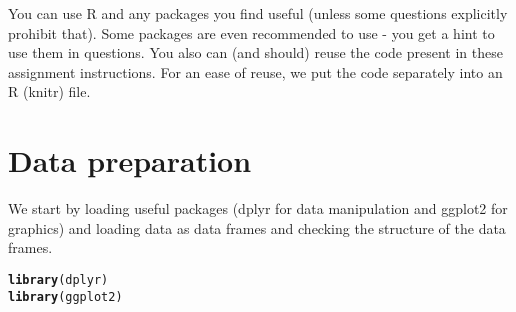 \documentclass{article}\usepackage[]{graphicx}\usepackage[]{color}
\makeatletter
\newcommand{\hlstd}[1]{\textcolor[rgb]{0.345,0.345,0.345}{#1}}%
\newcommand{\hlkwd}[1]{\textcolor[rgb]{0.737,0.353,0.396}{\textbf{#1}}}%
\newenvironment{kframe}{%
 \def\at@end@of@kframe{}%
 \ifinner\ifhmode%
  \def\at@end@of@kframe{\end{minipage}}%
  \begin{minipage}{\columnwidth}%
 \fi\fi%
 \def\FrameCommand##1{\hskip\@totalleftmargin \hskip-\fboxsep
 \colorbox{shadecolor}{##1}\hskip-\fboxsep
     \hskip-\linewidth \hskip-\@totalleftmargin \hskip\columnwidth}%
 \MakeFramed {\advance\hsize-\width
   \@totalleftmargin\z@ \linewidth\hsize
   \@setminipage}}%
 {\par\unskip\endMakeFramed%
 \at@end@of@kframe}
\newenvironment{knitrout}{}{} %
\makeatother
\begin{document}
You can use R and any packages you find useful (unless some questions explicitly prohibit that). Some packages are even recommended to use - you get a hint to use them in questions. You also can (and should) reuse the code present in these assignment instructions. For an ease of reuse, we put the code separately into an R (knitr) file.

\section{Data preparation}

We start by loading useful packages (dplyr for data manipulation and ggplot2 for graphics) and loading data as data frames and checking the structure of the data frames.

\begin{knitrout}
\color{fgcolor}\begin{kframe}
\begin{alltt}
\hlkwd{library}\hlstd{(dplyr)}
\hlkwd{library}\hlstd{(ggplot2)}


\end{alltt}
\end{kframe}
\end{knitrout}
\end{document}
